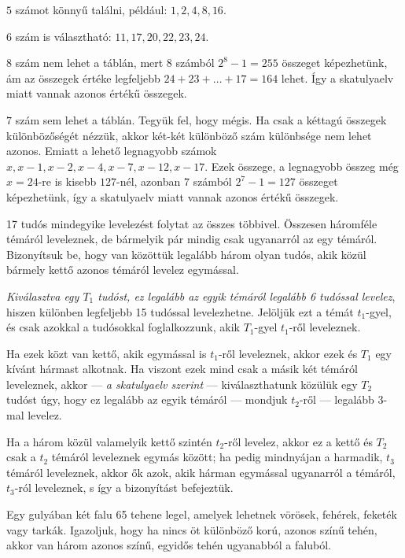 \begin{solution}
	$5$ számot könnyű találni, például: $1,2,4,8,16$.
	
	$6$ szám is választható: $11,17,20,22,23,24.$
	
	$8$ szám nem lehet a táblán, mert $8$ számból $2^{8}-1=255$ összeget
	képezhetünk, ám az összegek értéke legfeljebb $24+23+\dots+17=164$
	lehet. Így a skatulyaelv miatt vannak azonos értékű összegek.
	
	$7$ szám sem lehet a táblán. Tegyük fel, hogy mégis. Ha csak a kéttagú
	összegek különbözőségét nézzük, akkor két-két különböző szám különbsége
	nem lehet azonos. Emiatt a lehető legnagyobb számok $x,x-1,x-2,x-4,x-7,x-12,x-17$.
	Ezek összege, a legnagyobb összeg még $x=24$-re is kisebb $127$-nél,
	azonban $7$ számból $2^{7}-1=127$ összeget képezhetünk, így a skatulyaelv
	miatt vannak azonos értékű összegek.
\end{solution}
\begin{extraproblem}
	17 tudós mindegyike levelezést folytat az összes többivel. Összesen
	háromféle témáról leveleznek, de bármelyik pár mindig csak ugyanarról
	az egy témáról. Bizonyítsuk be, hogy van közöttük legalább három olyan
	tudós, akik közül bármely kettő azonos témáról levelez egymással.
\end{extraproblem}

\begin{solution}
	\textit{Kiválasztva egy $T_{1}$ tudóst, ez legalább az egyik témáról
		legalább 6 tudóssal levelez}, hiszen különben legfeljebb 15 tudóssal
	levelezhetne. Jelöljük ezt a témát $t_{1}$-gyel, és csak azokkal
	a tudósokkal foglalkozzunk, akik $T_{1}$-gyel $t_{1}$-ről leveleznek.
	
	Ha ezek közt van kettő, akik egymással is $t_{1}$-ről leveleznek,
	akkor ezek és $T_{1}$ egy kívánt hármast alkotnak. Ha viszont ezek
	mind csak a másik két témáról leveleznek, akkor --- \textit{a skatulyaelv
		szerint} --- kiválaszthatunk közülük egy $T_{2}$ tudóst úgy, hogy
	ez legalább az egyik témáról --- mondjuk $t_{2}$-ről --- legalább
	3-mal levelez.
	
	Ha a három közül valamelyik kettő szintén $t_{2}$-ről levelez, akkor
	ez a kettő és $T_{2}$ csak a $t_{2}$ témáról leveleznek egymás között;
	ha pedig mindnyájan a harmadik, $t_{3}$ témáról leveleznek, akkor
	ők azok, akik hárman egymással ugyanarról a témáról, $t_{3}$-ról
	leveleznek, s így a bizonyítást befejeztük.
\end{solution}
\begin{extraproblem}
	Egy gulyában két falu 65 tehene legel, amelyek lehetnek vörösek,
	fehérek, feketék vagy tarkák. Igazoljuk, hogy ha nincs öt különböző
	korú, azonos színű tehén, akkor van három azonos színű, egyidős tehén
	ugyanabból a faluból.
\end{extraproblem}

